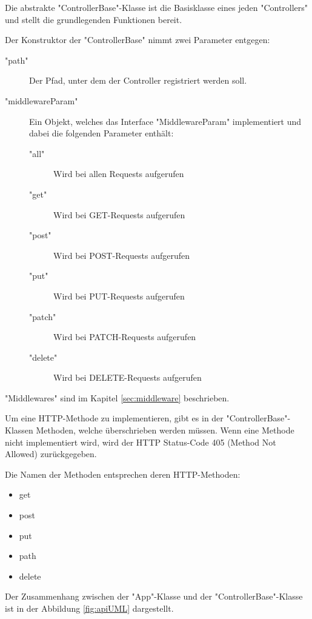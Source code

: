 
Die abstrakte "ControllerBase"-Klasse ist die Basisklasse eines jeden "Controllers" und stellt die grundlegenden Funktionen bereit. 

Der Konstruktor der "ControllerBase" nimmt zwei Parameter entgegen:

\begin{description}
    \item["path"] Der Pfad, unter dem der Controller registriert werden soll.
    \item["middlewareParam"] Ein Objekt, welches das Interface "MiddlewareParam" implementiert und dabei die folgenden Parameter enthält:
    \begin{description}
        \item["all"] Wird bei allen Requests aufgerufen
        \item["get"] Wird bei GET-Requests aufgerufen
        \item["post"] Wird bei POST-Requests aufgerufen
        \item["put"] Wird bei PUT-Requests aufgerufen
        \item["patch"] Wird bei PATCH-Requests aufgerufen
        \item["delete"] Wird bei DELETE-Requests aufgerufen
    \end{description}
\end{description}


"Middlewares" sind im Kapitel \ref{sec:middleware} beschrieben.

Um eine HTTP-Methode zu implementieren, gibt es in der "ControllerBase"-Klassen Methoden, welche überschrieben werden müssen. Wenn eine Methode nicht implementiert wird, wird der HTTP Status-Code 405 (Method Not Allowed) zurückgegeben.

Die Namen der Methoden entsprechen deren HTTP-Methoden:
\begin{itemize}
    \item get
    \item post
    \item put
    \item path
    \item delete
\end{itemize}


Der Zusammenhang zwischen der "App"-Klasse und der "ControllerBase"-Klasse ist in der Abbildung \ref{fig:apiUML} dargestellt.

